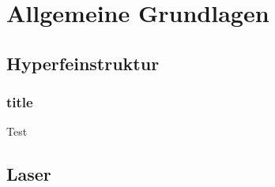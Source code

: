 \section{Allgemeine Grundlagen}
\subsection{Hyperfeinstruktur}

\begin{frame}
\frametitle{title}
  Test
\end{frame}

\subsection{Laser}
